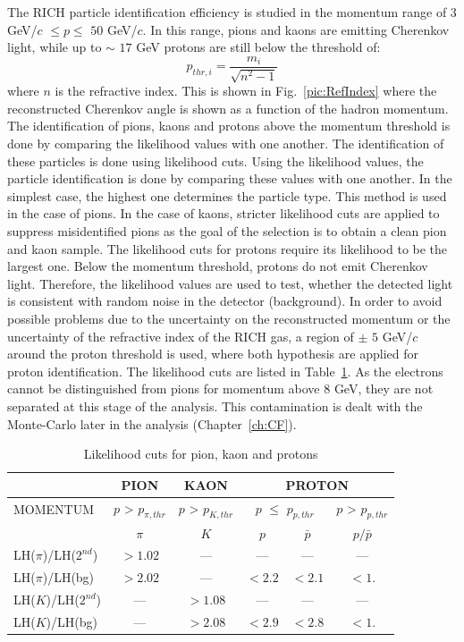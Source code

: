 The RICH particle identification efficiency is studied in the momentum range of $3$ GeV/$c$ $ \leq p \leq $ $50$ GeV/$c$. In this range, pions and kaons are emitting Cherenkov light, while up to $\sim$ $17$ GeV protons are still below the threshold of:
%
\begin{equation}
  p_{thr,i} = \frac{m_i}{ \sqrt{n^{2}-1} }
\end{equation}
%
where $n$ is the refractive index. This is shown in Fig.~\ref{pic:RefIndex} where the reconstructed Cherenkov angle is shown as a function of the hadron momentum. The identification of pions, kaons and protons above the momentum threshold is done by comparing the likelihood values with one another. The identification of these particles is done using likelihood cuts. Using the likelihood values, the particle identification is done by comparing these values with one another. In the simplest case, the highest one determines the particle type. This method is used in the case of pions. In the case of kaons, stricter likelihood cuts are applied to suppress misidentified pions as the goal of the selection is to obtain a clean pion and kaon sample.  The likelihood cuts for protons require its likelihood to be the largest one.  Below the momentum threshold, protons do not emit Cherenkov light. Therefore, the likelihood values are used to test, whether the detected light is consistent with random noise in the detector (background). In order to avoid possible problems due to the uncertainty on the reconstructed momentum or the uncertainty of the refractive index of the RICH gas, a region of $\pm$ $5$ GeV/$c$ around the proton threshold is used, where both hypothesis are applied for proton identification. The likelihood cuts are listed in Table~\ref{tab:LHcut}. As the electrons cannot be distinguished from pions for momentum above $8$ GeV, they are not separated at this stage of the analysis. This contamination is dealt with the Monte-Carlo later in the analysis (Chapter~\ref{ch:CF}).

\begin{table}[!h]
  \caption{Likelihood cuts for pion, kaon and protons}
  \label{tab:LHcut}
  \centering
  \begin{tabular}{lccccc}
    \hline
     & PION & KAON & \multicolumn{3}{c}{PROTON} \\
    \hline
    MOMENTUM & $p$ > $p_{\pi,thr}$ & $p$ > $p_{K,thr}$ & \multicolumn{2}{c}{$p$ $\leq$ $p_{p,thr}$} & $p$ > $p_{p,thr}$ \\
     & $\pi$ & $K$ & $p$ & $\bar{p}$ & $p/\bar{p}$ \\
    LH($\pi$)/LH($2^{nd}$) & $> 1.02$ & --- & --- & --- & --- \\
    LH($\pi$)/LH(bg) & $> 2.02$ & --- & $< 2.2$ & $< 2.1$ & $< 1.$\\
    LH($K$)/LH($2^{nd}$) & --- & $> 1.08$ & --- & --- & --- \\
    LH($K$)/LH(bg) & --- & $> 2.08$ & $< 2.9$ & $< 2.8$ & $< 1.$ \\
    \hline
  \end{tabular}
\end{table}

